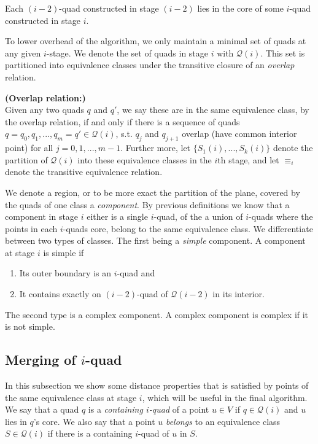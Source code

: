 \begin{Lemma}
Each $(i-2)$-quad constructed in stage $(i-2)$ lies in the core of some $i$-quad constructed in 
stage $i$. 
\end{Lemma}

To lower overhead of the algorithm, we only maintain a minimal set of quads at any given $i$-stage.
We denote the set of quads in stage $i$ with $\mathcal{Q}(i)$. This set is partitioned into 
equivalence classes under the transitive closure of an \textit{overlap} relation. 

\begin{mydef} \textbf{(Overlap relation:)} \\
Given any two quads $q$ and $q'$, we say these are in the same equivalence class, by the overlap 
relation, if and only if there is a sequence of quads $q = q_0, q_1, ..., q_m = q' \in 
\mathcal{Q}(i)$, s.t. $q_j$ and $q_{j+1}$ overlap (have common interior point) for all $j = 0, 1, 
..., m - 1$. Further more, let $\{S_1(i), ..., S_k(i)\}$ denote the partition of $\mathcal{Q}(i)$ 
into these equivalence classes in the $i$th stage, and let $\equiv_i$ denote the transitive 
equivalence relation. 
\end{mydef}

We denote a region, or to be more exact the partition of the plane, covered by the quads of one 
class a \textit{component}. By previous definitions we know that a component in stage $i$ either 
is a single $i$-quad, of the a union of $i$-quads where the points in each $i$-quads core, belong 
to the same equivalence class. We differentiate between two types of classes. The first being a 
\textit{simple} component. A component at stage $i$ is simple if

\begin{enumerate}
\item Its outer boundary is an $i$-quad and
\item It contains exactly on $(i-2)$-quad of $\mathcal{Q}(i-2)$ in its interior.
\end{enumerate}

The second type is a complex component. A complex component is complex if it is not simple.

\subsection{Merging of $i$-quad} \label{section:mergingiquad}

In this subsection we show some distance properties that is satisfied by points of the same 
equivalence class at stage $i$, which will be useful in the final algorithm. We say that a quad 
$q$ is a \textit{containing $i$-quad} of a point $u \in V$ if $q \in \mathcal{Q}(i)$ and $u$ lies 
in $q$'s core. We also say that a point $u$ \textit{belongs} to an equivalence class $S \in 
\mathcal{Q}(i)$ if there is a containing $i$-quad of $u$ in $S$.

